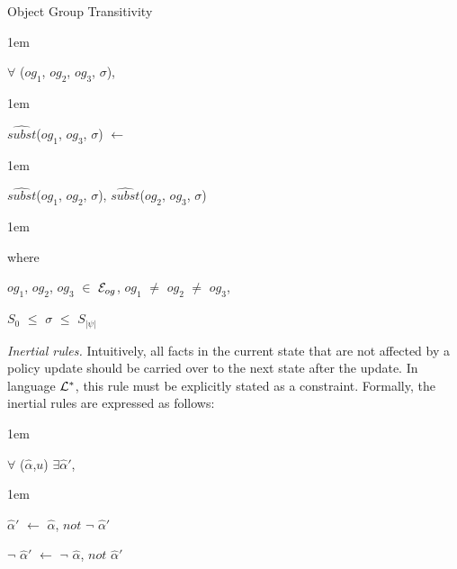 \documentclass[glov2,twocolumn,final]{svjour2}
\newenvironment{vquote}
  {\begin{list}{}{\leftmargin 1em}\item[]}
  {\end{list}}
\begin{document}
\begin{itemize}
\begin{enumerate}
                \item
                  Object Group Transitivity

                  \begin{vquote}
                    $\forall$ ($og_{1}$, $og_{2}$, $og_{3}$, $\sigma$),
                  \end{vquote}

                  \begin{vquote}
                    $\hat{subst}$($og_{1}$, $og_{3}$, $\sigma$) $\leftarrow$
                  \end{vquote}

                  \begin{vquote}
                    \hspace{1em}
                    $\hat{subst}$($og_{1}$, $og_{2}$, $\sigma$),
                    $\hat{subst}$($og_{2}$, $og_{3}$, $\sigma$)
                  \end{vquote}

                  \begin{vquote}
                    where

                    $og_{1}$, $og_{2}$, $og_{3}$ $\in$ ${\cal E}_{og}$,
                    $og_{1}$ $\neq$ $og_{2}$ $\neq$ $og_{3}$,

                    $S_{0}$ $\leq$ $\sigma$ $\leq$ $S_{|\psi|}$
                  \end{vquote}
               \end{enumerate}

            \item
              {\em Inertial rules.}
              Intuitively, all facts in the current state that are not affected
              by a policy update should be carried over to the next state after
              the update. In language ${\cal L}^{*}$, this rule must be
              explicitly stated as a constraint. Formally, the inertial rules
              are expressed as follows:

              \begin{vquote}
                $\forall$ ($\hat{\alpha}$,$u$) $\exists$$\hat{\alpha}'$,
              \end{vquote}

              \begin{vquote}
                $\hat{\alpha}'$ $\leftarrow$ $\hat{\alpha}$, $not$ $\lnot$ $\hat{\alpha}'$

                $\lnot$ $\hat{\alpha}'$ $\leftarrow$ $\lnot$ $\hat{\alpha}$, $not$ $\hat{\alpha}'$
              \end{vquote}


\end{itemize}
\end{document}
